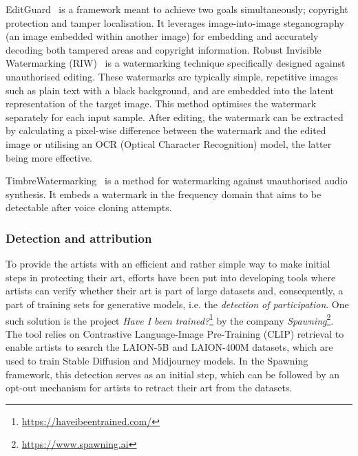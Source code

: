 \documentclass[conference,table]{IEEEtran} %
\newcommand{\reminder}[2][]
{\todo[color=blue!18, #1]{#2}}
\begin{document}
EditGuard~\cite{zhang_editguard_2023} is a framework meant to achieve two goals simultaneously; copyright protection and tamper localisation. 
It leverages image-into-image steganography (an image embedded within another image) for embedding and accurately decoding both tampered areas and copyright information. 
Robust Invisible Watermarking (RIW)~\cite{tan_somewhat_2023} is a watermarking technique specifically designed against unauthorised editing. 
These watermarks are typically simple, repetitive images such as plain text with a black background, and are embedded into the latent representation of the target image. 
This method optimises the watermark separately for each input sample. 
After editing, the watermark can be extracted by calculating a pixel-wise difference between the watermark and the edited image or utilising an OCR (Optical Character Recognition) model, the latter being more effective.

TimbreWatermarking~\cite{liu_detecting_2024} is a method for watermarking against unauthorised audio synthesis. 
It embeds a watermark in the frequency domain that aims to be detectable after voice cloning attempts.

\subsubsection{Detection and attribution}\label{sec:mitigation-detection}


To provide the artists with an efficient and rather simple way to make initial steps in protecting their art, efforts have been put into developing tools where artists can verify whether their art is part of large datasets and, consequently, a part of training sets for generative models, i.e. the \textit{detection of participation}. 
One such solution is the project \textit{Have I been trained?}\footnote{\url{https://haveibeentrained.com/}} %
by the company \textit{Spawning}\footnote{\url{https://www.spawning.ai}}. %
The tool relies on Contrastive Language-Image Pre-Training (CLIP) retrieval to enable artists to search the LAION-5B and LAION-400M datasets, which are used to train Stable Diffusion and Midjourney models. 
In the Spawning framework, this detection serves as an initial step, which can be followed by an opt-out mechanism for artists to retract their art from the datasets. 
\end{document}
